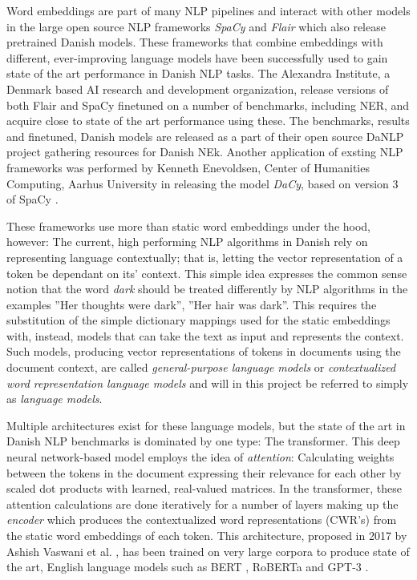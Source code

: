 \documentclass[main.tex]{subfiles}
\begin{document}
Word embeddings are part of many NLP pipelines and interact with other models in the large open source NLP frameworks \emph{SpaCy} \cite{honnibal2020spacy} and \emph{Flair} \cite{akbik2019flair} which also release pretrained Danish models.
These frameworks that combine embeddings with different, ever-improving language models have been successfully used to gain state of the art performance in Danish NLP tasks.
The Alexandra Institute, a Denmark based AI research and development organization, release versions of both Flair and SpaCy finetuned on a number of benchmarks, including NER, and acquire close to state of the art performance using these.
The benchmarks, results and finetuned, Danish models are released as a part of their open source DaNLP project gathering resources for Danish NEk\cite{danlp2021}.
Another application of exsting NLP frameworks was performed by Kenneth Enevoldsen, Center of Humanities Computing, Aarhus University in releasing the model \emph{DaCy}, based on version 3 of SpaCy \cite{enevoldsen2020dacy}.

These frameworks use more than static word embeddings under the hood, however:
The current, high performing NLP algorithms in Danish rely on representing language contextually; that is, letting the vector representation of a token be dependant on its' context.
This simple idea expresses the common sense notion that the word \emph{dark} should be treated differently by NLP algorithms in the examples ''Her thoughts were dark'', ''Her hair was dark''.
This requires the substitution of the simple dictionary mappings used for the static embeddings with, instead, models that can take the text as input and represents the context.
Such models, producing vector representations of tokens in documents using the document context, are called \emph{general-purpose language models} \cite[Chap. 2]{birk2020knowledge} or \emph{contextualized word representation language models} \cite[Sec. 2]{yamada2020luke} and will in this project be referred to simply as \emph{language models}.

Multiple architectures exist for these language models, but the state of the art in Danish NLP benchmarks is dominated by one type: The transformer.
This deep neural network-based model employs the idea of \emph{attention}:
Calculating weights between the tokens in the document expressing their relevance for each other by scaled dot products with learned, real-valued matrices.
In the transformer, these attention calculations are done iteratively for a number of layers making up the \emph{encoder} which produces the contextualized word representations (CWR's) from the static word embeddings of each token.
This architecture, proposed in 2017 by Ashish Vaswani et al. \cite{vaswani2017att}, has been trained on very large corpora to produce state of the art, English language models such as BERT \cite{devlin2019bert}, RoBERTa \cite{liu2019roberta} and GPT-3 \cite{brown2020language}.
\end{document}
